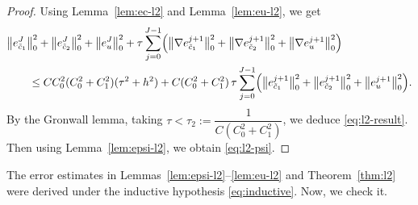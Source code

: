 \begin{proof}
Using Lemma~\ref{lem:ec-l2} and Lemma~\ref{lem:eu-l2}, we get
\begin{align}
  &\bigl\|e_{\tilde{c}_{1}}^{J}\bigr\|_{0}^{2}
   + \bigl\|e_{\tilde{c}_{2}}^{J}\bigr\|_{0}^{2}
   + \bigl\|e_{u}^{J}\bigr\|_{0}^{2}
   + \tau\sum_{j=0}^{J-1}\Bigl(\bigl\|\nabla e_{\tilde{c}_{1}}^{j+1}\bigr\|_{0}^{2}
                               + \bigl\|\nabla e_{\tilde{c}_{2}}^{j+1}\bigr\|_{0}^{2}
                               + \bigl\|\nabla e_{u}^{j+1}\bigr\|_{0}^{2}\Bigr)
  \nonumber\\
  &\qquad \leq CC_{0}^{2}(C_{0}^{2}+C_{1}^{2})(\tau^{2}+h^{2})
   + C(C_{0}^{2}+C_{1}^{2})\,\tau\sum_{j=0}^{J-1}
     \Bigl(\bigl\|e_{\tilde{c}_{1}}^{j+1}\bigr\|_{0}^{2}
          + \bigl\|e_{\tilde{c}_{2}}^{j+1}\bigr\|_{0}^{2}
          + \bigl\|e_{u}^{j+1}\bigr\|_{0}^{2}\Bigr).
  \label{eq:combined-l2}
\end{align}
By the Gronwall lemma, taking $\tau < \tau_{2} := \dfrac{1}{C(C_{0}^{2}+C_{1}^{2})}$,
we deduce \eqref{eq:l2-result}. Then using Lemma~\ref{lem:epsi-l2}, we obtain \eqref{eq:l2-psi}.
\end{proof}

The error estimates in Lemmas~\ref{lem:epsi-l2}--\ref{lem:eu-l2} and Theorem~\ref{thm:l2}
were derived under the inductive hypothesis \eqref{eq:inductive}. Now, we check it.

